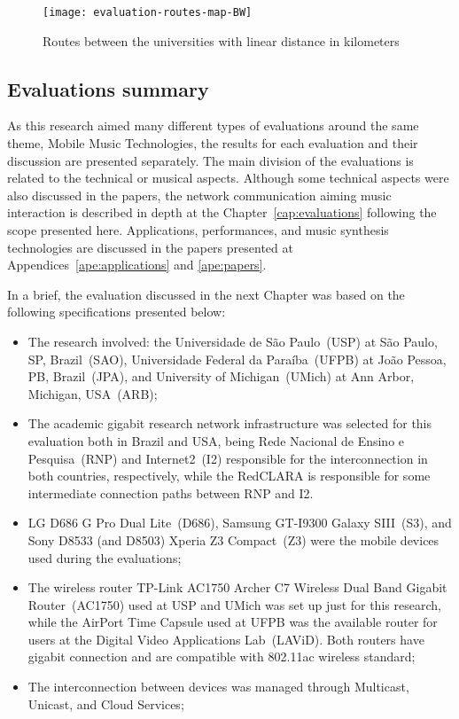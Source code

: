 \begin{figure}[!ht]
	\centering
	\texttt{[image: evaluation-routes-map-BW]}
	\caption{Routes between the universities with linear distance in kilometers}
	\label{fig:routes}
\end{figure}

\subsection{Evaluations summary}

As this research aimed many different types of evaluations around the same theme, Mobile Music Technologies, the results for each evaluation and their discussion are presented separately.
The main division of the evaluations is related to the technical or musical aspects.
Although some technical aspects were also discussed in the papers, the network communication aiming music interaction is described in depth at the Chapter~\ref{cap:evaluations} following the scope presented here.
Applications, performances, and music synthesis technologies are discussed in the papers presented at Appendices~\ref{ape:applications} and \ref{ape:papers}.

In a brief, the evaluation discussed in the next Chapter was based on the following specifications presented below:

\begin{itemize}
	\item The research involved: the Universidade de São Paulo~(USP) at São Paulo, SP, Brazil~(SAO), Universidade Federal da Paraíba~(UFPB) at João Pessoa, PB, Brazil~(JPA), and University of Michigan~(UMich) at Ann Arbor, Michigan, USA~(ARB);
	\item The academic gigabit research network infrastructure was selected for this evaluation both in Brazil and USA, being Rede Nacional de Ensino e Pesquisa~(RNP) and Internet2~(I2) responsible for the interconnection in both countries, respectively, while the RedCLARA is responsible for some intermediate connection paths between RNP and I2.
	\item LG D686 G Pro Dual Lite~(D686), Samsung GT-I9300 Galaxy SIII~(S3), and Sony D8533 (and D8503) Xperia Z3 Compact~(Z3) were the mobile devices used during the evaluations;
	\item The wireless router TP-Link AC1750 Archer C7 Wireless Dual Band Gigabit Router~(AC1750) used at USP and UMich was set up just for this research, while the AirPort Time Capsule used at UFPB was the available router for users at the Digital Video Applications Lab~(LAViD). Both routers have gigabit connection and are compatible with 802.11ac wireless standard;
	\item The interconnection between devices was managed through Multicast, Unicast, and Cloud Services;
\end{itemize}

